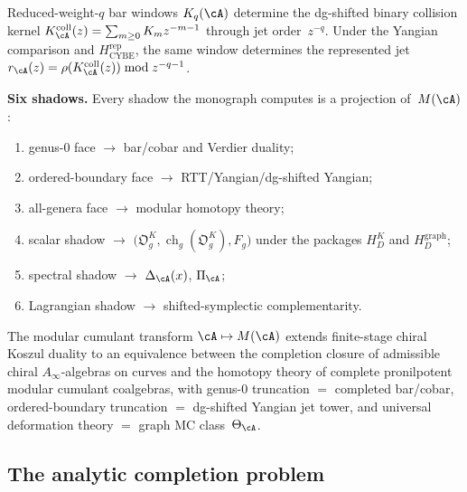 \begin{conjecture}
\label{conj:jet-principle}
Reduced-weight-$q$ bar windows $K_q(\cA)$ determine the dg-shifted
binary collision kernel
$K_\cA^{\mathrm{coll}}(z)=\sum_{m\geq0}K_mz^{-m-1}$ through jet
order~$z^{-q}$.  Under the Yangian comparison and
$H_{\mathrm{CYBE}}^{\mathrm{rep}}$, the same window determines the
represented jet
$r_\cA(z)=\rho(K_\cA^{\mathrm{coll}}(z))\bmod z^{-q-1}$.
\end{conjecture}

\noindent
\textbf{Six shadows.} Every shadow the monograph computes is a
projection of~$M(\cA)$:
\begin{enumerate}
\item genus-$0$ face $\to$ bar/cobar and Verdier duality;
\item ordered-boundary face $\to$ RTT/Yangian/dg-shifted Yangian;
\item all-genera face $\to$ modular homotopy theory;
\item scalar shadow $\to$
$\bigl(\mathfrak O_g^K,\operatorname{ch}_g(\mathfrak O_g^K),F_g\bigr)$
under the packages $H_D^K$ and $H_D^{\mathrm{graph}}$;
\item spectral shadow $\to$ $\Delta_\cA(x)$, $\Pi_\cA$;
\item Lagrangian shadow $\to$ shifted-symplectic complementarity.
\end{enumerate}

\begin{conjecture}
\label{conj:grand-completion}
The modular cumulant transform $\cA \mapsto M(\cA)$ extends
finite-stage chiral Koszul duality to an equivalence between the
completion closure of admissible chiral $A_\infty$-algebras on curves
and the homotopy theory of complete pronilpotent modular cumulant
coalgebras, with genus-$0$ truncation $=$ completed bar/cobar,
ordered-boundary truncation $=$ dg-shifted Yangian jet tower, and
universal deformation theory $=$ graph MC
class~$\Theta_\cA$.
\end{conjecture}

\subsection{The analytic completion problem}
\label{subsec:analytic-completion-programme}

